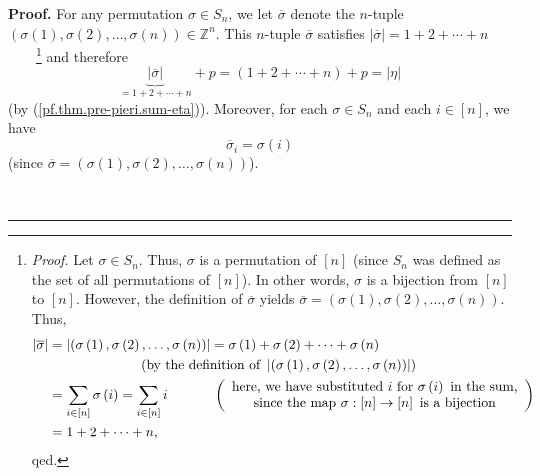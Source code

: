 \documentclass
[numbers=enddot,12pt,final,onecolumn,notitlepage,english]{scrartcl}%
\theoremstyle{definition}
\newenvironment{proof}[1][Proof]{\noindent\textbf{#1.} }{\ \rule{0.5em}{0.5em}}
\let\sumnonlimits\sum
\renewcommand{\sum}{\sumnonlimits\limits}
\newenvironment{verlong}{}{}
\begin{document}
\begin{verlong}
\begin{proof}
For any permutation $\sigma\in S_{n}$, we let $\overline{\sigma}$ denote the
$n$-tuple $\left(  \sigma\left(  1\right)  ,\sigma\left(  2\right)
,\ldots,\sigma\left(  n\right)  \right)  \in\mathbb{Z}^{n}$. This $n$-tuple
$\overline{\sigma}$ satisfies $\left\vert \overline{\sigma}\right\vert
=1+2+\cdots+n$\ \ \ \ \footnote{\textit{Proof.} Let $\sigma\in S_{n}$. Thus,
$\sigma$ is a permutation of $\left[  n\right]  $ (since $S_{n}$ was defined
as the set of all permutations of $\left[  n\right]  $). In other words,
$\sigma$ is a bijection from $\left[  n\right]  $ to $\left[  n\right]  $.
However, the definition of $\overline{\sigma}$ yields $\overline{\sigma
}=\left(  \sigma\left(  1\right)  ,\sigma\left(  2\right)  ,\ldots
,\sigma\left(  n\right)  \right)  $. Thus,%
\begin{align*}
\left\vert \overline{\sigma}\right\vert  &  =\left\vert \left(  \sigma\left(
1\right)  ,\sigma\left(  2\right)  ,\ldots,\sigma\left(  n\right)  \right)
\right\vert =\sigma\left(  1\right)  +\sigma\left(  2\right)  +\cdots
+\sigma\left(  n\right) \\
&  \ \ \ \ \ \ \ \ \ \ \ \ \ \ \ \ \ \ \ \ \left(  \text{by the definition of
}\left\vert \left(  \sigma\left(  1\right)  ,\sigma\left(  2\right)
,\ldots,\sigma\left(  n\right)  \right)  \right\vert \right) \\
&  =\sum_{i\in\left[  n\right]  }\sigma\left(  i\right)  =\sum_{i\in\left[
n\right]  }i\ \ \ \ \ \ \ \ \ \ \left(
\begin{array}
[c]{c}%
\text{here, we have substituted }i\text{ for }\sigma\left(  i\right)  \text{
in the sum,}\\
\text{since the map }\sigma:\left[  n\right]  \rightarrow\left[  n\right]
\text{ is a bijection}%
\end{array}
\right) \\
&  =1+2+\cdots+n,
\end{align*}
qed.} and therefore
\begin{equation}
\underbrace{\left\vert \overline{\sigma}\right\vert }_{=1+2+\cdots
+n}+p=\left(  1+2+\cdots+n\right)  +p=\left\vert \eta\right\vert
\label{pf.thm.pre-pieri.modsigbar1}%
\end{equation}
(by (\ref{pf.thm.pre-pieri.sum-eta})). Moreover, for each $\sigma\in S_{n}$
and each $i\in\left[  n\right]  $, we have%
\begin{equation}
\overline{\sigma}_{i}=\sigma\left(  i\right)  \label{pf.thm.pre-pieri.sigbari}%
\end{equation}
(since $\overline{\sigma}=\left(  \sigma\left(  1\right)  ,\sigma\left(
2\right)  ,\ldots,\sigma\left(  n\right)  \right)  $).


\end{proof}
\end{verlong}
\end{document}
